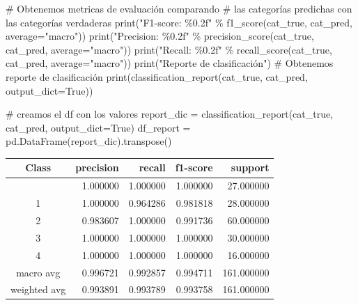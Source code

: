 \documentclass[
  10pt,
]{article}
\newenvironment{Shaded}{\begin{snugshade}}{\end{snugshade}}
\newcommand{\BuiltInTok}[1]{\textcolor[rgb]{0.00,0.23,0.31}{#1}}
\newcommand{\CommentTok}[1]{\textcolor[rgb]{0.37,0.37,0.37}{#1}}
\newcommand{\NormalTok}[1]{\textcolor[rgb]{0.00,0.23,0.31}{#1}}
\newcommand{\OperatorTok}[1]{\textcolor[rgb]{0.37,0.37,0.37}{#1}}
\newcommand{\SpecialCharTok}[1]{\textcolor[rgb]{0.37,0.37,0.37}{#1}}
\newcommand{\StringTok}[1]{\textcolor[rgb]{0.13,0.47,0.30}{#1}}
\newcommand{\VariableTok}[1]{\textcolor[rgb]{0.07,0.07,0.07}{#1}}
\newcounter{none} %
\begin{document}
\begin{Shaded}
\begin{Highlighting}[]
\CommentTok{\# Obtenemos metricas de evaluación comparando}
\CommentTok{\# las categorías predichas con las categorías verdaderas}
\BuiltInTok{print}\NormalTok{(}\StringTok{"F1{-}score: }\SpecialCharTok{\%0.2f}\StringTok{"} \OperatorTok{\%}\NormalTok{ f1\_score(cat\_true, cat\_pred, average}\OperatorTok{=}\StringTok{"macro"}\NormalTok{))}
\BuiltInTok{print}\NormalTok{(}\StringTok{"Precision: }\SpecialCharTok{\%0.2f}\StringTok{"} \OperatorTok{\%}\NormalTok{ precision\_score(cat\_true, cat\_pred, average}\OperatorTok{=}\StringTok{"macro"}\NormalTok{))}
\BuiltInTok{print}\NormalTok{(}\StringTok{"Recall: }\SpecialCharTok{\%0.2f}\StringTok{"} \OperatorTok{\%}\NormalTok{ recall\_score(cat\_true, cat\_pred, average}\OperatorTok{=}\StringTok{"macro"}\NormalTok{))}
\BuiltInTok{print}\NormalTok{(}\StringTok{"Reporte de clasificación"}\NormalTok{)}
\CommentTok{\# Obtenemos reporte de clasificación}
\BuiltInTok{print}\NormalTok{(classification\_report(cat\_true, cat\_pred, output\_dict}\OperatorTok{=}\VariableTok{True}\NormalTok{))}

\CommentTok{\# creamos el df con los valores}
\NormalTok{report\_dic }\OperatorTok{=}\NormalTok{ classification\_report(cat\_true, cat\_pred, output\_dict}\OperatorTok{=}\VariableTok{True}\NormalTok{)}
\NormalTok{df\_report }\OperatorTok{=}\NormalTok{ pd.DataFrame(report\_dic).transpose()}
\end{Highlighting}
\end{Shaded}

{\def\LTcaptype{none} %
\begin{longtable}[]{@{}crrrr@{}}
\toprule\noalign{}
Class & precision & recall & f1-score & support \\
\midrule\noalign{}
\endhead
\bottomrule\noalign{}
\endlastfoot
0 & 1.000000 & 1.000000 & 1.000000 & 27.000000 \\
1 & 1.000000 & 0.964286 & 0.981818 & 28.000000 \\
2 & 0.983607 & 1.000000 & 0.991736 & 60.000000 \\
3 & 1.000000 & 1.000000 & 1.000000 & 30.000000 \\
4 & 1.000000 & 1.000000 & 1.000000 & 16.000000 \\
macro avg & 0.996721 & 0.992857 & 0.994711 & 161.000000 \\
weighted avg & 0.993891 & 0.993789 & 0.993758 & 161.000000 \\
\end{longtable}
}
\end{document}
